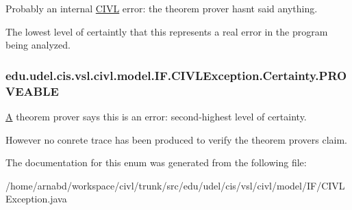 Probably an internal \hyperlink{classedu_1_1udel_1_1cis_1_1vsl_1_1civl_1_1CIVL}{C\+I\+V\+L} error\+: the theorem prover hasn\textquotesingle{}t said anything. 

The lowest level of certaintly that this represents a real error in the program being analyzed. \hypertarget{enumedu_1_1udel_1_1cis_1_1vsl_1_1civl_1_1model_1_1IF_1_1CIVLException_1_1Certainty_a35ff314a942b67b0bdf679b069ad40bf}{}
\subsubsection[{P\+R\+O\+V\+E\+A\+B\+L\+E}]{\setlength{\rightskip}{0pt plus 5cm}edu.\+udel.\+cis.\+vsl.\+civl.\+model.\+I\+F.\+C\+I\+V\+L\+Exception.\+Certainty.\+P\+R\+O\+V\+E\+A\+B\+L\+E}\label{enumedu_1_1udel_1_1cis_1_1vsl_1_1civl_1_1model_1_1IF_1_1CIVLException_1_1Certainty_a35ff314a942b67b0bdf679b069ad40bf}


\hyperlink{structA}{A} theorem prover says this is an error\+: second-\/highest level of certainty. 

However no conrete trace has been produced to verify the theorem prover\textquotesingle{}s claim. 

The documentation for this enum was generated from the following file\+:\begin{DoxyCompactItemize}
\item 
/home/arnabd/workspace/civl/trunk/src/edu/udel/cis/vsl/civl/model/\+I\+F/C\+I\+V\+L\+Exception.\+java\end{DoxyCompactItemize}
